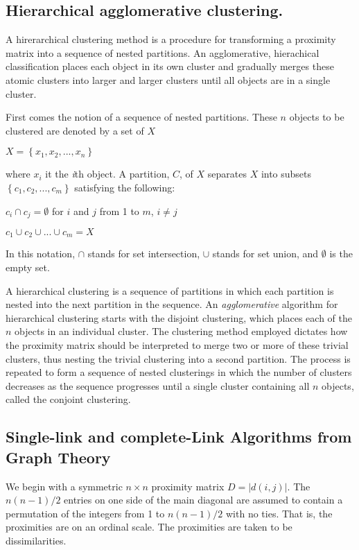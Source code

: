 \subsection{Hierarchical agglomerative clustering.}

A hirerarchical clustering method is a procedure for transforming a proximity matrix into a sequence of nested partitions. An agglomerative, hierachical classification places each object in its own cluster and gradually merges these atomic clusters into larger and larger clusters until all objects are in a single cluster. 

First comes the notion of a sequence of nested partitions. These $n$ objects to be clustered are denoted by a set of $X$ \\
\centerline{$X = \left \{ x_1, x_2, ..., x_n \right \}$}

where $x_i$ it the \textit{i}th object. A partition, $C$, of $X$ separates $X$ into subsets $\left \{ c_1, c_2, ..., c_m \right \}$ satisfying the following:

\centerline{\hspace*{-5cm} $c_i \cap c_j = \emptyset$ for $i$ and $j$ from 1 to $m$, $i \neq j$}
\centerline{\hspace*{-8.3cm} $c_1 \cup c_2 \cup ... \cup c_m = X$}

In this notation, $\cap$ stands for set intersection, $\cup$ stands for set union, and $\emptyset$ is the empty set. 

A hierarchical clustering is a sequence of partitions in which each partition is nested into the next partition in the sequence. An \textit{agglomerative} algorithm for hierarchical clustering starts with the disjoint clustering, which places each of the $n$ objects in an individual cluster. The clustering method employed dictates how the proximity matrix should be interpreted to merge two or more of these trivial clusters, thus nesting the trivial clustering into a second partition. The process is repeated to form a sequence of nested clusterings in which the number of clusters decreases as the sequence progresses until a single cluster containing all $n$ objects, called the conjoint clustering.

\subsection{Single-link and complete-Link Algorithms from Graph Theory}

We begin with a symmetric $n \times n$ proximity matrix $D = |d(i, j)|$. The $n(n - 1)/2$ entries on one side of the main diagonal are assumed to contain a permutation of the integers from 1 to $n(n - 1)/2$ with no ties. That is, the proximities are on an ordinal scale. The proximities are taken to be dissimilarities. 

